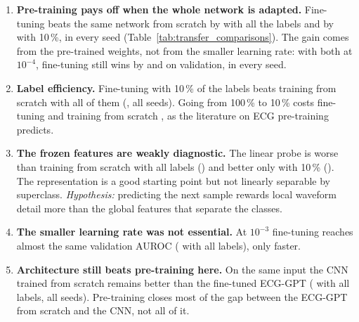 \begin{enumerate}[leftmargin=1.4em,itemsep=2pt]
  \item \textbf{Pre-training pays off when the whole network is adapted.} Fine-tuning beats the same
        network from scratch by \transferTestDiffMeanFinetuneVsScratchFOneZeroZero{} with all the labels
        and by \transferTestDiffMeanFinetuneVsScratchFOneZero{} with 10\,\%, in every seed
        (Table~\ref{tab:transfer_comparisons}). The gain comes from the pre-trained weights, not from
        the smaller learning rate: with both at $10^{-4}$, fine-tuning still wins by
        \transferValDiffMeanFinetuneVsScratchLrOneEFourFOneZeroZero{} and
        \transferValDiffMeanFinetuneVsScratchLrOneEFourFOneZero{} on validation, in every seed.
  \item \textbf{Label efficiency.} Fine-tuning with 10\,\% of the labels beats training from scratch
        with all of them (\transferTestDiffMeanFinetuneFOneZeroVsScratchFOneZeroZero{}, all seeds).
        Going from 100\,\% to 10\,\% costs fine-tuning \transferTestDiffMeanFinetuneFOneZeroZeroVsFOneZero{}
        and training from scratch \transferTestDiffMeanScratchFOneZeroZeroVsFOneZero{}, as the
        literature on ECG pre-training predicts.
  \item \textbf{The frozen features are weakly diagnostic.} The linear probe is worse than training
        from scratch with all labels (\transferTestDiffMeanProbeVsScratchFOneZeroZero{}) and better
        only with 10\,\% (\transferTestDiffMeanProbeVsScratchFOneZero{}). The representation is a good
        starting point but not linearly separable by superclass. \emph{Hypothesis:} predicting the next
        sample rewards local waveform detail more than the global features that separate the classes.
  \item \textbf{The smaller learning rate was not essential.} At $10^{-3}$ fine-tuning reaches almost
        the same validation AUROC (\transferValDiffMeanLrOneEThreeVsFinetuneFOneZeroZero{} with all
        labels), only faster.
  \item \textbf{Architecture still beats pre-training here.} On the same input the CNN trained from
        scratch remains better than the fine-tuned ECG-GPT
        (\comparisonTestDiffMeanFinetuneFOneZeroZeroVsOneleadCnn{} with all labels, all seeds).
        Pre-training closes most of the gap between the ECG-GPT from scratch and the CNN, not all of
        it.
\end{enumerate}

